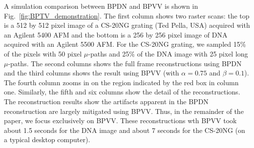 \documentclass[journal]{IEEEtran}
\begin{document}



A simulation comparison between BPDN and BPVV is shown in
Fig.~\ref{fig:BPTV_demonstration}. The first column shows two raster
scans: the top is a 512 by 512 pixel image of a CS-20NG grating (Ted Pella, USA) acquired
with an Agilent 5400 AFM and the bottom is a 256 by 256 pixel image of
DNA acquired with an Agilent 5500 AFM. For the CS-20NG grating, we
sampled 15\% of the pixels with 50 pixel $\mu$-paths and 25\%
of the DNA image with 25 pixel long $\mu$-paths. The second columns
shows the full frame reconstructions using BPDN and the third columns
shows the result using BPVV (with $\alpha = 0.75$ and $\beta = 0.1$). The fourth column zooms in on the region
indicated by the red box in column one. Similarly, the fifth and six
columns show the detail of the reconstructions. The reconstruction
results show the artifacts apparent in the BPDN reconstruction are
largely mitigated using BPVV. Thus, in the remainder of the paper, we
focus exclusively on BPVV. These reconstructions wth BPVV took about
1.5 seconds for the DNA image and about 7 seconds for the
CS-20NG (on a typical desktop computer).
	

\end{document}
